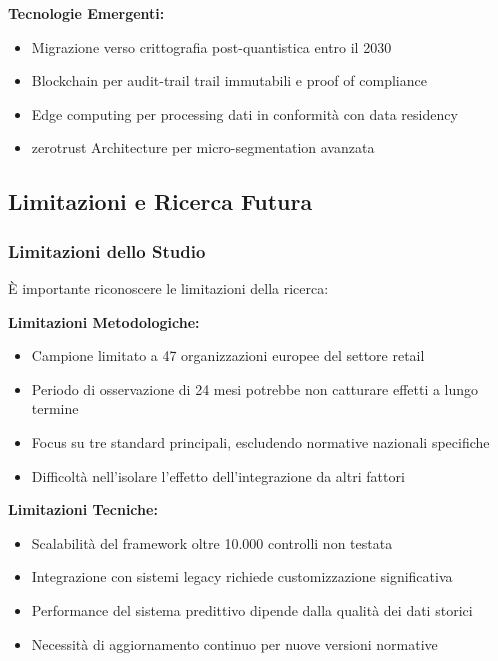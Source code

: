 \textbf{Tecnologie Emergenti:}
\begin{itemize}
    \item Migrazione verso crittografia post-quantistica entro il 2030
    \item Blockchain per \gls{audit-trail} trail immutabili e proof of compliance
    \item Edge computing per processing dati in conformità con data residency
    \item \gls{zerotrust} Architecture per \gls{micro-segmentation} avanzata
\end{itemize}

\subsection{\texorpdfstring{Limitazioni e Ricerca Futura}{4.9.4 - Limitazioni e Ricerca Futura}}

\subsubsection{\texorpdfstring{Limitazioni dello Studio}{4.9.4.1 - Limitazioni dello Studio}}

È importante riconoscere le limitazioni della ricerca:

\textbf{Limitazioni Metodologiche:}
\begin{itemize}
    \item Campione limitato a 47 organizzazioni europee del settore retail
    \item Periodo di osservazione di 24 mesi potrebbe non catturare effetti a lungo termine
    \item Focus su tre standard principali, escludendo normative nazionali specifiche
    \item Difficoltà nell'isolare l'effetto dell'integrazione da altri fattori
\end{itemize}

\textbf{Limitazioni Tecniche:}
\begin{itemize}
    \item Scalabilità del framework oltre 10.000 controlli non testata
    \item Integrazione con sistemi legacy richiede customizzazione significativa
    \item Performance del sistema predittivo dipende dalla qualità dei dati storici
    \item Necessità di aggiornamento continuo per nuove versioni normative
\end{itemize}

